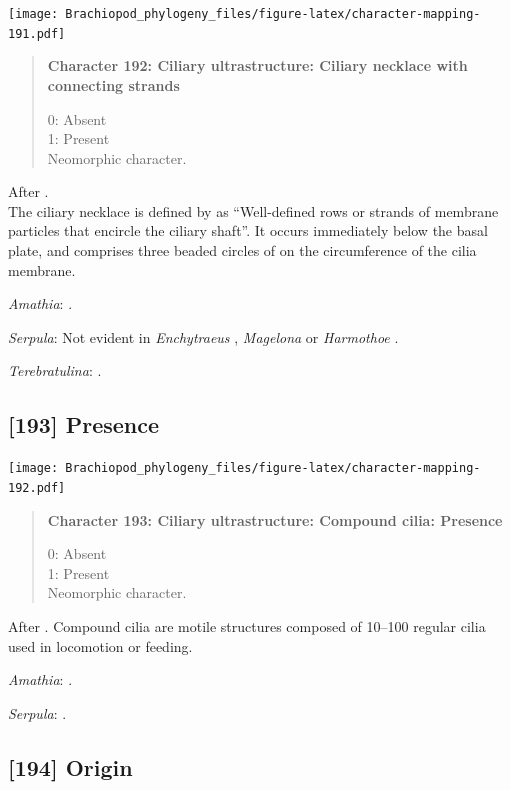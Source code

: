 \documentclass[openany]{book}
\begin{document}
\texttt{[image: Brachiopod\_phylogeny\_files/figure-latex/character-mapping-191.pdf]}

\begin{quote}
\textbf{Character 192: Ciliary ultrastructure: Ciliary necklace with
connecting strands}

0: Absent\\
1: Present\\
Neomorphic character.
\end{quote}

After \citet{Lundin2009}.\\
The ciliary necklace is defined by \citet{Gilula1972} as ``Well-defined
rows or strands of membrane particles that encircle the ciliary shaft''.
It occurs immediately below the basal plate, and comprises three beaded
circles of on the circumference of the cilia membrane.

\hypertarget{Amathia-coding-192}{}
\emph{Amathia}: \citet{Reed1982}.

\hypertarget{Serpula-coding-192}{}
\emph{Serpula}: Not evident in \emph{Enchytraeus} \citep{Reger1967},
\emph{Magelona} \citep{Bartolomaeus1995} or \emph{Harmothoe}
\citep{Holborow1969}.

\hypertarget{Terebratulina-coding-192}{}
\emph{Terebratulina}: \citep{Luter1995}.

\subsection*{{[}193{]} Presence}\label{presence-3}

\texttt{[image: Brachiopod\_phylogeny\_files/figure-latex/character-mapping-192.pdf]}

\begin{quote}
\textbf{Character 193: Ciliary ultrastructure: Compound cilia: Presence}

0: Absent\\
1: Present\\
Neomorphic character.
\end{quote}

After \citet{Lundin2009}. Compound cilia are motile structures composed
of 10--100 regular cilia used in locomotion or feeding.

\hypertarget{Amathia-coding-193}{}
\emph{Amathia}: \citet{Reed1982}.

\hypertarget{Serpula-coding-193}{}
\emph{Serpula}: \citet{Nielsen1987}.

\subsection*{{[}194{]} Origin}\label{origin-1}
\end{document}
